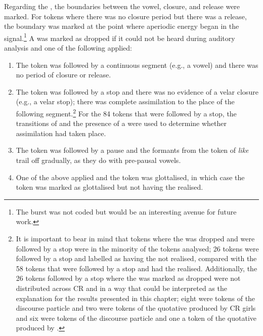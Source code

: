
Regarding the , the boundaries between the vowel, closure, and release were marked. For tokens where there was no closure period but there was a release, the boundary was marked at the point where aperiodic energy began in the signal.\footnote{The burst was not coded but would be an interesting avenue for future work.} A  was marked as dropped if it could not be heard during auditory analysis and one of the following applied:

\begin{enumerate}
	\item The token was followed by a continuous segment (e.g., a vowel) and there was no period of closure or release.
	\item The token was followed by a stop and there was no evidence of a velar closure (e.g., a velar stop); there was complete assimilation to the place of the following segment.\footnote{It is important to bear in mind that tokens where the  was dropped and were followed by a stop were in the minority of the tokens analysed; 26 tokens were followed by a stop and labelled as having the  not realised, compared with the 58 tokens that were followed by a stop and had the  realised. Additionally, the 26 tokens followed by a stop where the  was marked as dropped were not distributed across CR and  in a way that could be interpreted as the explanation for the results presented in this chapter; eight were tokens of the discourse particle and two were tokens of the quotative produced by CR girls and six were tokens of the discourse particle and one a token of the quotative produced by .} For the 84 tokens that were followed by a stop, the transitions of  and the presence of a  \citep[89]{harringtoncassidy1999} were used to determine whether assimilation had taken place.
	\item The token was followed by a pause and the formants from the token of \textit{like} trail off gradually, as they do with pre-pausal vowels.
	\item One of the above applied and the token was glottalised, in which case the token was marked as glottalised but not having the  realised.
\end{enumerate}

